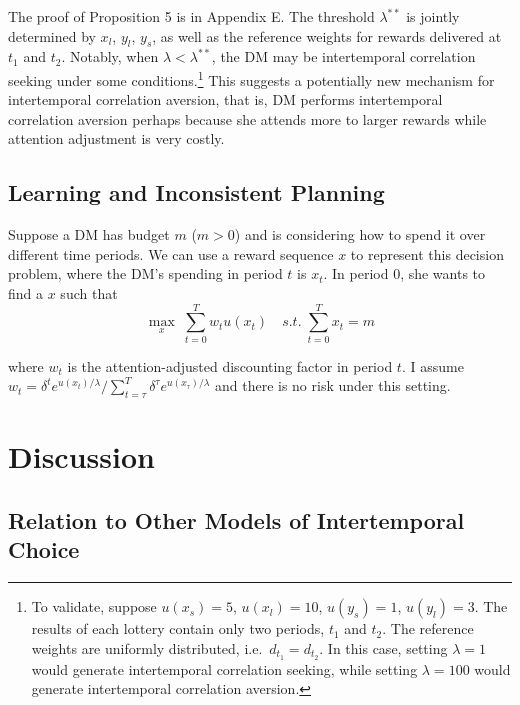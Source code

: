 \documentclass[
  12pt,
]{article}
\begin{document}
The proof of Proposition 5 is in Appendix E. The threshold
\(\lambda^{**}\) is jointly determined by \(x_l\), \(y_l\), \(y_s\), as
well as the reference weights for rewards delivered at \(t_1\) and
\(t_2\). Notably, when \(\lambda < \lambda^{**}\), the DM may be
intertemporal correlation seeking under some conditions.\footnote{To
  validate, suppose \(u(x_s)=5\), \(u(x_l)=10\), \(u(y_s)=1\),
  \(u(y_l)=3\). The results of each lottery contain only two periods,
  \(t_1\) and \(t_2\). The reference weights are uniformly distributed,
  i.e.~\(d_{t_1}=d_{t_2}\). In this case, setting \(\lambda=1\) would
  generate intertemporal correlation seeking, while setting
  \(\lambda=100\) would generate intertemporal correlation aversion.}
This suggests a potentially new mechanism for intertemporal correlation
aversion, that is, DM performs intertemporal correlation aversion
perhaps because she attends more to larger rewards while attention
adjustment is very costly.

\hypertarget{learning-and-inconsistent-planning}{%
\subsection{Learning and Inconsistent
Planning}\label{learning-and-inconsistent-planning}}

Suppose a DM has budget \(m\) (\(m>0\)) and is considering how to spend
it over different time periods. We can use a reward sequence \(x\) to
represent this decision problem, where the DM's spending in period \(t\)
is \(x_t\). In period 0, she wants to find a \(x\) such
that\[ \tag{3} \max_{x}\;\sum_{t=0}^T w_t u(x_t)\quad s.t. \;\sum_{t=0}^T x_t = m   \]

where \(w_t\) is the attention-adjusted discounting factor in period
\(t\). I assume
\(w_t=\delta^t e^{u(x_t)/\lambda}/\sum_{t=\tau}^T \delta^{\tau} e^{u(x_\tau)/\lambda}\)
and there is no risk under this setting.

\hypertarget{discussion}{%
\section{Discussion}\label{discussion}}

\hypertarget{relation-to-other-models-of-intertemporal-choice}{%
\subsection{Relation to Other Models of Intertemporal
Choice}\label{relation-to-other-models-of-intertemporal-choice}}
\end{document}
